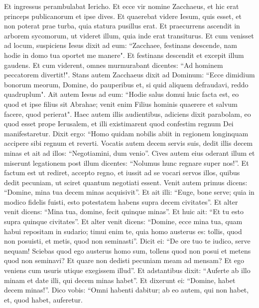 \begin{biblechapter}  
\verse Et ingressus perambulabat Iericho. 
\verse Et ecce vir nomine Zacchaeus, et hic erat princeps publicanorum et ipse dives. 
\verse Et quaerebat videre Iesum, quis esset, et non poterat prae turba, quia statura pusillus erat. 
\verse Et praecurrens ascendit in arborem sycomorum, ut videret illum, quia inde erat transiturus. 
\verse Et cum venisset ad locum, suspiciens Iesus dixit ad eum: “Zacchaee, festinans descende, nam hodie in domo tua oportet me manere". 
\verse Et festinans descendit et excepit illum gaudens. 
\verse Et cum viderent, omnes murmurabant dicentes: “Ad hominem peccatorem divertit!". 
\verse Stans autem Zacchaeus dixit ad Dominum: “Ecce dimidium bonorum meorum, Domine, do pauperibus et, si quid aliquem defraudavi, reddo quadruplum". 
\verse Ait autem Iesus ad eum: “Hodie salus domui huic facta est, eo quod et ipse filius sit Abrahae; 
\verse venit enim Filius hominis quaerere et salvum facere, quod perierat". 
\verse Haec autem illis audientibus, adiciens dixit parabolam, eo quod esset prope Ierusalem, et illi existimarent quod confestim regnum Dei manifestaretur. 
\verse Dixit ergo: “Homo quidam nobilis abiit in regionem longinquam accipere sibi regnum et reverti. 
\verse Vocatis autem decem servis suis, dedit illis decem minas et ait ad illos: “Negotiamini, dum venio”. 
\verse Cives autem eius oderant illum et miserunt legationem post illum dicentes: “Nolumus hunc regnare super nos!”. 
\verse Et factum est ut rediret, accepto regno, et iussit ad se vocari servos illos, quibus dedit pecuniam, ut sciret quantum negotiati essent. 
\verse Venit autem primus dicens: “Domine, mina tua decem minas acquisivit”. 
\verse Et ait illi: “Euge, bone serve; quia in modico fidelis fuisti, esto potestatem habens supra decem civitates”. 
\verse Et alter venit dicens: “Mina tua, domine, fecit quinque minas”. 
\verse Et huic ait: “Et tu esto supra quinque civitates”. 
\verse Et alter venit dicens: “Domine, ecce mina tua, quam habui repositam in sudario; 
\verse timui enim te, quia homo austerus es: tollis, quod non posuisti, et metis, quod non seminasti”. 
\verse Dicit ei: “De ore tuo te iudico, serve nequam! Sciebas quod ego austerus homo sum, tollens quod non posui et metens quod non seminavi?  
\verse Et quare non dedisti pecuniam meam ad mensam? Et ego veniens cum usuris utique exegissem illud”. 
\verse Et adstantibus dixit: “Auferte ab illo minam et date illi, qui decem minas habet”. 
\verse Et dixerunt ei: “Domine, habet decem minas!”. 
\verse Dico vobis: “Omni habenti dabitur; ab eo autem, qui non habet, et, quod habet, auferetur. 

\end{biblechapter}
